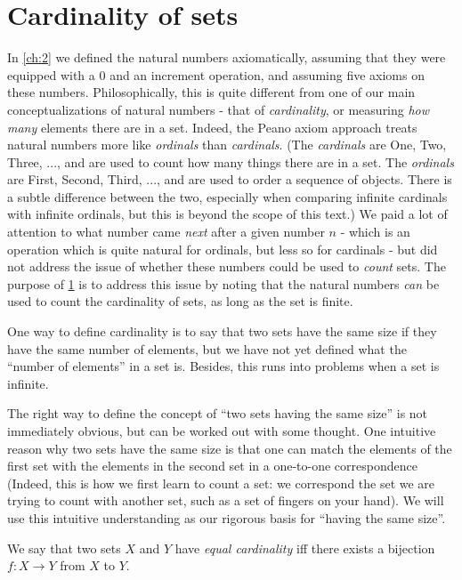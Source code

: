 \section{Cardinality of sets}\label{sec:3.6}

\begin{note}
	In \cref{ch:2} we defined the natural numbers axiomatically, assuming that they were equipped with a \(0\) and an increment operation, and assuming five axioms on these numbers.
	Philosophically, this is quite different from one of our main conceptualizations of natural numbers
	- that of \emph{cardinality}, or measuring \emph{how many} elements there are in a set.
	Indeed, the Peano axiom approach treats natural numbers more like \emph{ordinals} than \emph{cardinals}.
	(The \emph{cardinals} are One, Two, Three, ..., and are used to count how many things there are in a set.
	The \emph{ordinals} are First, Second, Third, ..., and are used to order a sequence of objects.
	There is a subtle difference between the two, especially when comparing infinite cardinals with infinite ordinals, but this is beyond the scope of this text.)
	We paid a lot of attention to what number came \emph{next} after a given number \(n\)
	- which is an operation which is quite natural for ordinals, but less so for cardinals
	- but did not address the issue of whether these numbers could be used to \emph{count} sets.
	The purpose of \cref{sec:3.6} is to address this issue by noting that the natural numbers \emph{can} be used to count the cardinality of sets, as long as the set is finite.

	One way to define cardinality is to say that two sets have the same size if they have the same number of elements, but we have not yet defined what the ``number of elements'' in a set is.
	Besides, this runs into problems when a set is infinite.

	The right way to define the concept of ``two sets having the same size'' is not immediately obvious, but can be worked out with some thought.
	One intuitive reason why two sets have the same size is that one can match the elements of the first set with the elements in the second set in a one-to-one correspondence
	(Indeed, this is how we first learn to count a set:
	we correspond the set we are trying to count with another set, such as a set of fingers on your hand).
	We will use this intuitive understanding as our rigorous basis for ``having the same size''.
\end{note}

\begin{defn}\label{3.6.1}
	We say that two sets \(X\) and \(Y\) have \emph{equal cardinality} iff there exists a bijection \(f : X \to Y\) from \(X\) to \(Y\).
\end{defn}

